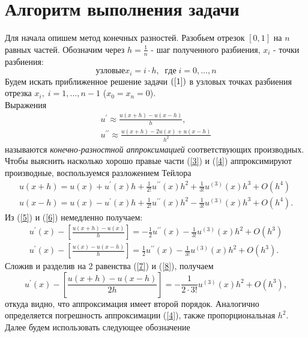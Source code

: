 \documentclass[a4paper,11.9pt]{article}
\begin{document}
\section*{\centering Алгоритм выполнения задачи} \Large
Для начала опишем метод конечных разностей. Разобьем отрезок $[0, 1]$ на $n$ равных частей. Обозначим через $h = \frac{1}{n}$ - шаг полученного разбиения, $x_i$ - точки разбиения: 
\begin{equation}
узловые x_i = i\cdot h, \; \; где\;  i = 0, \ldots, n \label{2}
\end{equation}
Будем искать приближенное решение задачи $(\ref{1})$ в узловых точках разбиения отрезка $x_i, \; i = 1, \ldots, n - 1$ ($x_0 = x_n = 0$). \\
Выражения 
\begin{gather}
    u^\prime \approx \frac{u(x + h) - u(x - h)}{h},\label{3}\\
    u^{\prime\prime} \approx \frac{u(x + h) - 2u(x) + u(x - h)}{h^2}\label{4}
\end{gather}
называются \textit{конечно-разностной аппроксимацией} соответствующих производных. Чтобы выяснить насколько хорошо правые части (\ref{3}) и (\ref{4}) аппроксимируют производные, воспользуемся разложением Тейлора
\begin{gather}
    u(x + h) = u(x) + u^\prime(x)h + \frac{1}{2!}u^{\prime \prime}(x)h^2 + \frac{1}{3!}u^{(3)}(x)h^3 + O(h^4)\label{5}\\
    u(x - h) = u(x) - u^\prime(x)h + \frac{1}{2!}u^{\prime \prime}(x)h^2 - \frac{1}{3!}u^{(3)}(x)h^3 + O(h^4).\label{6} 
\end{gather}
Из (\ref{5}) и (\ref{6}) немедленно получаем:
\begin{gather}
u^\prime(x) - \left[\frac{u(x + h) - u(x)}{h} \right] = -\frac{1}{2}u^{\prime \prime}(x) - \frac{1}{3!}u^{(3)}(x)h^2 + O(h^3)\label{7}\\
u^\prime(x) - \left[\frac{u(x) - u(x - h)}{h} \right] = \frac{1}{2}u^{\prime \prime}(x) - \frac{1}{3!}u^{(3)}(x)h^2 + O(h^3).\label{8}
\end{gather}
Сложив и разделив на 2 равенства (\ref{7}) и (\ref{8}), получаем
\begin{equation}
    u^\prime(x) - \left[\frac{u(x + h) - u(x - h)}{2h} \right] = - \frac{1}{2\cdot 3!}u^{(3)}(x)h^2 + O(h^3),
\end{equation}
откуда видно, что аппроксимация имеет второй порядок. Аналогично определяется погрешность аппроксимации (\ref{4}), также пропорциональная $h^2$.\\
Далее будем использовать следующее обозначение 
\end{document}
